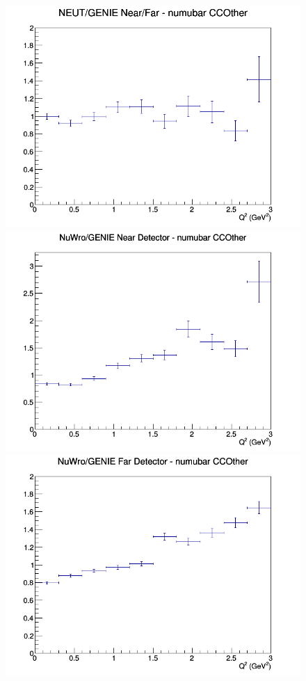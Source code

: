\documentclass[12pt]{article}
\begin{document}
\begin{figure}[h]
\endminipage
{}
\includegraphics[width=\linewidth]{eff_Q2/FGT/ratios/CCOther_NEUT_GENIE_numubar_NF_Q2.png}
\endminipage
\newline
{}
\includegraphics[width=\linewidth]{eff_Q2/FGT/ratios/CCOther_NuWro_GENIE_numubar_near_Q2.png}
\endminipage
{}
\includegraphics[width=\linewidth]{eff_Q2/FGT/ratios/CCOther_NuWro_GENIE_numubar_far_Q2.png}

\end{figure}
\end{document}

